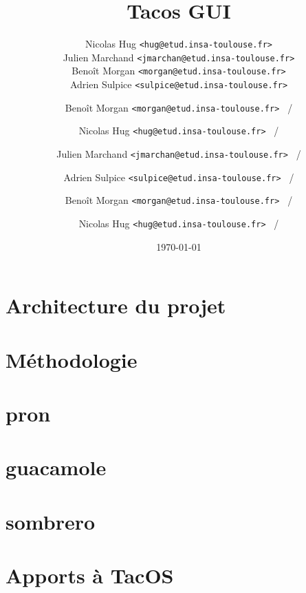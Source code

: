 \documentclass[xcolor=table,12pt]{beamer}
\title{Tacos GUI}
\author[Tacos GUI Team]{
\footnotesize
Nicolas Hug \texttt{<hug@etud.insa-toulouse.fr>}\\
Julien Marchand \texttt{<jmarchan@etud.insa-toulouse.fr>}\\
Benoît Morgan \texttt{<morgan@etud.insa-toulouse.fr>}\\
Adrien Sulpice \texttt{<sulpice@etud.insa-toulouse.fr>}\\
\normalsize
}
\institute{INSA de Toulouse}
\date{\today}
\begin{document}

\frame{\titlepage}


\author{Benoît Morgan \texttt{<morgan@etud.insa-toulouse.fr> } \insertframenumber/\inserttotalframenumber}
\section{Architecture du projet}


\author{Nicolas Hug \texttt{<hug@etud.insa-toulouse.fr> } \insertframenumber/\inserttotalframenumber}
\section{Méthodologie}


\author{Julien Marchand \texttt{<jmarchan@etud.insa-toulouse.fr> } \insertframenumber/\inserttotalframenumber}
\section{pron}


\author{Adrien Sulpice \texttt{<sulpice@etud.insa-toulouse.fr> } \insertframenumber/\inserttotalframenumber}
\section{guacamole}


\author{Benoît Morgan \texttt{<morgan@etud.insa-toulouse.fr> } \insertframenumber/\inserttotalframenumber}
\section{sombrero}


\author{Nicolas Hug \texttt{<hug@etud.insa-toulouse.fr> } \insertframenumber/\inserttotalframenumber}
\section{Apports à TacOS}

\end{document}

